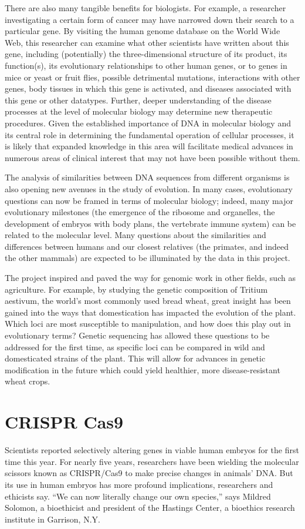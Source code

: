 \documentclass[12pt]{article}
\begin{document}
There are also many tangible benefits for biologists. For example, a researcher investigating a certain form of cancer may have narrowed down their search to a particular gene. By visiting the human genome database on the World Wide Web, this researcher can examine what other scientists have written about this gene, including (potentially) the three-dimensional structure of its product, its function(s), its evolutionary relationships to other human genes, or to genes in mice or yeast or fruit flies, possible detrimental mutations, interactions with other genes, body tissues in which this gene is activated, and diseases associated with this gene or other datatypes. Further, deeper understanding of the disease processes at the level of molecular biology may determine new therapeutic procedures. Given the established importance of DNA in molecular biology and its central role in determining the fundamental operation of cellular processes, it is likely that expanded knowledge in this area will facilitate medical advances in numerous areas of clinical interest that may not have been possible without them.

The analysis of similarities between DNA sequences from different organisms is also opening new avenues in the study of evolution. In many cases, evolutionary questions can now be framed in terms of molecular biology; indeed, many major evolutionary milestones (the emergence of the ribosome and organelles, the development of embryos with body plans, the vertebrate immune system) can be related to the molecular level. Many questions about the similarities and differences between humans and our closest relatives (the primates, and indeed the other mammals) are expected to be illuminated by the data in this project.

The project inspired and paved the way for genomic work in other fields, such as agriculture. For example, by studying the genetic composition of Tritium aestivum, the world’s most commonly used bread wheat, great insight has been gained into the ways that domestication has impacted the evolution of the plant. Which loci are most susceptible to manipulation, and how does this play out in evolutionary terms? Genetic sequencing has allowed these questions to be addressed for the first time, as specific loci can be compared in wild and domesticated strains of the plant. This will allow for advances in genetic modification in the future which could yield healthier, more disease-resistant wheat crops.

\section{CRISPR Cas9}
Scientists reported selectively altering genes in viable human embryos for the first time this year. For nearly five years, researchers have been wielding the molecular scissors known as CRISPR/Cas9 to make precise changes in animals’ DNA. But its use in human embryos has more profound implications, researchers and ethicists say.
“We can now literally change our own species,” says Mildred Solomon, a bioethicist and president of the Hastings Center, a bioethics research institute in Garrison, N.Y.
\end{document}
